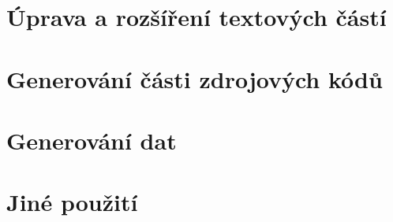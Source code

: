 \section{Úprava a rozšíření textových částí}
\label{sec:ai-text}


\section{Generování části zdrojových kódů}
\label{sec:ai-kod}


\section{Generování dat}
\label{sec:ai-data}


\section{Jiné použití}
\label{sec:ai-ostatni}

